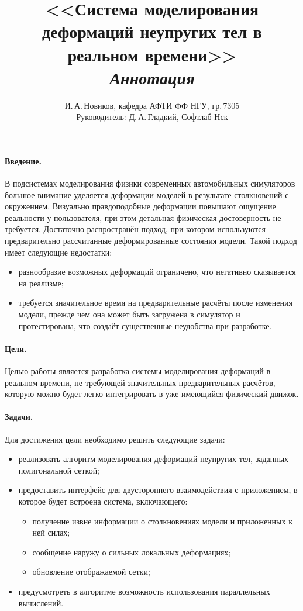 \documentclass[a4paper,11pt]{article}
\author{И.\,А.\,Новиков, кафедра АФТИ ФФ НГУ, гр.\,7305\\ Руководитель: Д.\,А.\,Гладкий, Софтлаб-Нск}
\title{<<Система моделирования деформаций неупругих тел в реальном времени>>\\\itshape Аннотация}
\begin{document}
  \maketitle
  \thispagestyle{empty}
  \paragraph{Введение.}
    В подсистемах моделирования физики современных автомобильных симуляторов большое внимание
    уделяется деформации моделей в результате столкновений с окружением. Визуально
    правдоподобные деформации повышают ощущение реальности у пользователя, при этом детальная
    физическая достоверность не требуется. Достаточно распространён подход, при
    котором используются предварительно рассчитанные деформированные состояния модели.
    Такой подход имеет следующие недостатки:
    \begin{itemize}
      \item разнообразие возможных деформаций ограничено, что негативно сказывается на реализме;
      \item требуется значительное время на предварительные расчёты после изменения модели, прежде чем
        она может быть загружена в симулятор и протестирована, что создаёт существенные неудобства при разработке.
    \end{itemize}
  \paragraph{Цели.}
    Целью работы является разработка системы моделирования деформаций в реальном
    времени, не требующей значительных предварительных расчётов, которую можно будет легко
    интегрировать в уже имеющийся физический движок.
  \paragraph{Задачи.}
    Для достижения цели необходимо решить следующие задачи:
    \begin{itemize}
      \item реализовать алгоритм моделирования деформаций неупругих тел, заданных полигональной сеткой;
      \item предоставить интерфейс для двустороннего взаимодействия с приложением, в которое будет
        встроена система, включающего:
        \begin{itemize}
          \item получение извне информации о столкновениях модели и приложенных к ней силах;
          \item сообщение наружу о сильных локальных деформациях;
          \item обновление отображаемой сетки;
        \end{itemize}
      \item предусмотреть в алгоритме возможность использования параллельных вычислений.
    \end{itemize}
\end{document}
